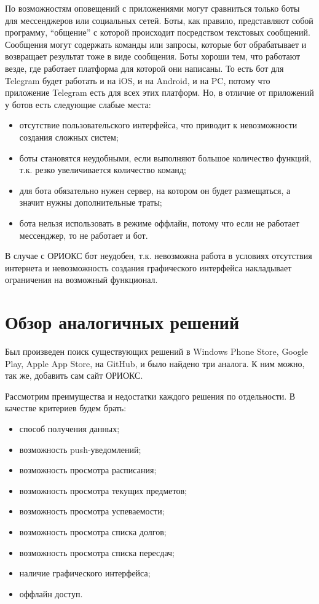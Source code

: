 По возможностям оповещений с приложениями могут сравниться только боты для мессенджеров или социальных сетей.
Боты, как правило, представляют собой программу, ``общение'' с которой происходит посредством текстовых сообщений.
Сообщения могут содержать команды или запросы, которые бот обрабатывает и возвращает результат тоже в виде сообщения.
Боты хороши тем, что работают везде, где работает платформа для которой они написаны.
То есть бот для Telegram будет работать и на iOS, и на Android, и на PC, потому что приложение Telegram есть для всех этих платформ.
Но, в отличие от приложений у ботов есть следующие слабые места:
\begin{itemize}
  \item отсутствие пользовательского интерфейса, что приводит к невозможности создания сложных систем;
  \item боты становятся неудобными, если выполняют большое количество функций, т.к. резко увеличивается количество команд;
  \item для бота обязательно нужен сервер, на котором он будет размещаться, а значит нужны дополнительные траты;
  \item бота нельзя использовать в режиме оффлайн, потому что если не работает мессенджер, то не работает и бот.
\end{itemize}

В случае с ОРИОКС бот неудобен, т.к. невозможна работа в условиях отсутствия интернета и невозможность создания графического интерфейса накладывает ограничения на возможный функционал.

\section{Обзор аналогичных решений}
\label{sec:analogs}
Был произведен поиск существующих решений в Windows Phone Store, Google Play, Apple App Store, на GitHub, и было найдено три аналога.
К ним можно, так же, добавить сам сайт ОРИОКС.

Рассмотрим преимущества и недостатки каждого решения по отдельности.
В качестве критериев будем брать:
\begin{itemize}
  \item способ получения данных;
  \item возможность push-уведомлений;
  \item возможность просмотра расписания;
  \item возможность просмотра текущих предметов;
  \item возможность просмотра успеваемости;
  \item возможность просмотра списка долгов;
  \item возможность просмотра списка пересдач;
  \item наличие графического интерфейса;
  \item оффлайн доступ.
\end{itemize}

